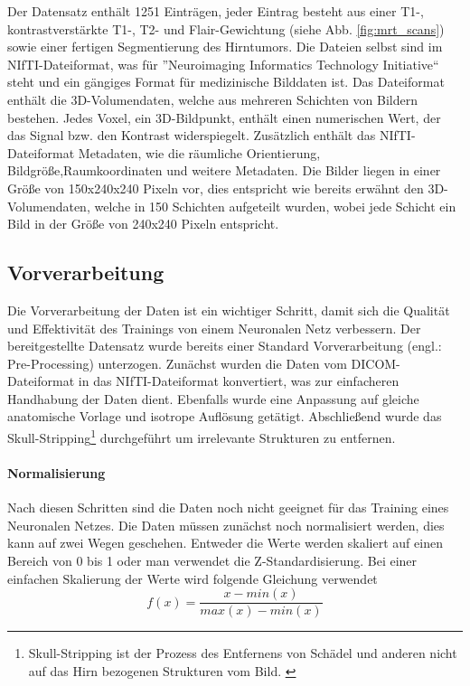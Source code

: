 Der Datensatz enthält 1251 Einträgen, jeder Eintrag besteht aus einer T1-, kontrastverstärkte T1-, T2- und Flair-Gewichtung (siehe Abb. \ref{fig:mrt_scans}) sowie einer fertigen Segmentierung des Hirntumors. Die Dateien selbst sind im NIfTI-Dateiformat, was für ''Neuroimaging Informatics Technology Initiative`` steht und ein gängiges Format für medizinische Bilddaten ist. Das Dateiformat enthält die 3D-Volumendaten, welche aus mehreren Schichten von Bildern bestehen. Jedes Voxel, ein 3D-Bildpunkt, enthält einen numerischen Wert, der das Signal bzw. den Kontrast widerspiegelt. Zusätzlich enthält das NIfTI-Dateiformat Metadaten, wie die räumliche Orientierung, Bildgröße,Raumkoordinaten und weitere Metadaten. \cite[][]{NIfTI} Die Bilder liegen in einer Größe von 150x240x240 Pixeln vor, dies entspricht wie bereits erwähnt den 3D-Volumendaten, welche in 150 Schichten aufgeteilt wurden, wobei jede Schicht ein Bild in der Größe von 240x240 Pixeln entspricht.


\subsection{Vorverarbeitung}
Die Vorverarbeitung der Daten ist ein wichtiger Schritt, damit sich die Qualität und Effektivität des Trainings von einem Neuronalen Netz verbessern. Der bereitgestellte Datensatz wurde bereits einer Standard Vorverarbeitung (engl.: Pre-Processing) unterzogen. Zunächst wurden die Daten vom DICOM-Dateiformat in das NIfTI-Dateiformat konvertiert, was zur einfacheren Handhabung der Daten dient. Ebenfalls wurde eine Anpassung auf gleiche anatomische Vorlage und isotrope Auflösung getätigt. Abschließend wurde  das Skull-Stripping\footnote{Skull-Stripping ist der Prozess des Entfernens von Schädel und anderen nicht auf das Hirn bezogenen Strukturen vom Bild. \cite[vgl.][]{SwiebockaWiek2016}} durchgeführt um irrelevante Strukturen zu entfernen. \cite[vgl.][]{Baid2021}

\paragraph{Normalisierung}
Nach diesen Schritten sind die Daten noch nicht geeignet für das Training eines Neuronalen Netzes. Die Daten müssen zunächst noch normalisiert werden, dies kann auf zwei Wegen geschehen. Entweder die Werte werden skaliert auf einen Bereich von 0 bis 1 oder man verwendet die Z-Standardisierung. Bei einer einfachen Skalierung der Werte wird folgende Gleichung verwendet
\begin{equation}
	f(x)=\frac{x - min(x)}{max(x) - min(x)}
\end{equation}

